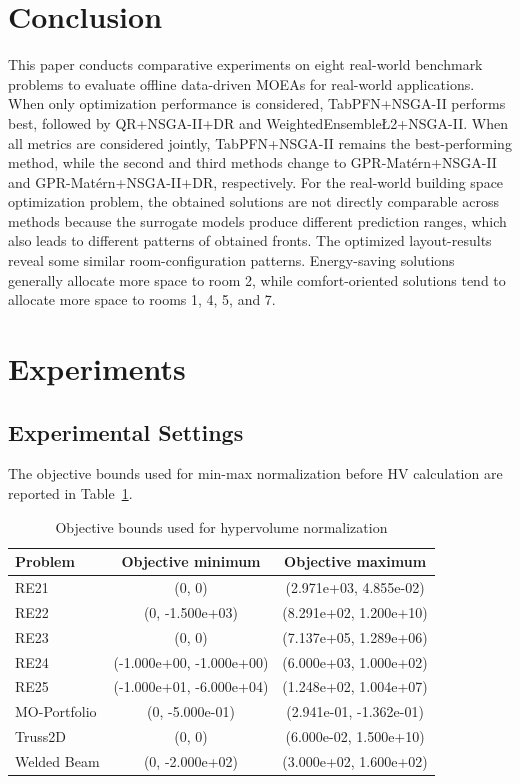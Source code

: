 \documentclass[conference]{IEEEtran}
\begin{document}
\section{Conclusion}
This paper conducts comparative experiments on eight real-world benchmark problems to evaluate offline data-driven \gls{MOEAs} for real-world applications. When only optimization performance is considered, TabPFN+NSGA-II performs best, followed by QR+NSGA-II+DR and WeightedEnsemble\L2+NSGA-II. When all metrics are considered jointly, TabPFN+NSGA-II remains the best-performing method, while the second and third methods change to GPR-Mat\'ern+NSGA-II and GPR-Mat\'ern+NSGA-II+DR, respectively. For the real-world building space optimization problem, the obtained solutions are not directly comparable across methods because the surrogate models produce different prediction ranges, which also leads to different patterns of obtained fronts. The optimized layout-results reveal some similar room-configuration patterns. Energy-saving solutions generally allocate more space to room 2, while comfort-oriented solutions tend to allocate more space to rooms 1, 4, 5, and 7.









\appendix
\section{Experiments}
\subsection{Experimental Settings}
The objective bounds used for min-max normalization before \gls{HV} calculation are reported in Table~\ref{tab_hv_objective_bounds}. 


\begin{table}[ht]
\caption{Objective bounds used for hypervolume normalization}
\centering
\begin{tabular}{lcc}
\toprule
Problem & Objective minimum & Objective maximum \\
\midrule
RE21 &(0, 0) &(2.971e+03, 4.855e-02) \\
RE22 &(0, -1.500e+03) &(8.291e+02, 1.200e+10) \\
RE23 &(0, 0) &(7.137e+05, 1.289e+06) \\
RE24 &(-1.000e+00, -1.000e+00) &(6.000e+03, 1.000e+02) \\
RE25 &(-1.000e+01, -6.000e+04) &(1.248e+02, 1.004e+07) \\
MO-Portfolio &(0, -5.000e-01) &(2.941e-01, -1.362e-01) \\
Truss2D &(0, 0) &(6.000e-02, 1.500e+10) \\
Welded Beam &(0, -2.000e+02) &(3.000e+02, 1.600e+02) \\
\bottomrule
\end{tabular}
\label{tab_hv_objective_bounds}
\end{table}
\end{document}
